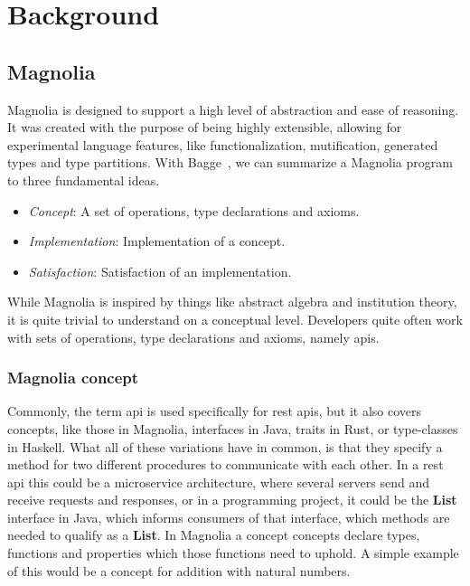 \chapter{Background} \label{cha:background}

\section{Magnolia}

Magnolia is designed to support a high level of abstraction and ease of
reasoning. It was created with the purpose of being highly extensible,
allowing for experimental language features, like functionalization,
mutification, generated types and type partitions. With Bagge~\cite{baggeThesis},
we can summarize a Magnolia program to three fundamental ideas.

\begin{itemize}
  \item \textit{Concept}: A set of operations, type declarations and axioms.
  \item \textit{Implementation}: Implementation of a concept.
  \item \textit{Satisfaction}: Satisfaction of an implementation.
\end{itemize}

While Magnolia is inspired by things like abstract algebra and institution
theory, it is quite trivial to understand on a conceptual level. Developers quite
often work with sets of operations, type declarations and axioms, namely
\gls*{api}s.

\subsection{Magnolia concept}

Commonly, the term \gls*{api} is used specifically for \gls*{rest} \gls*{api}s, but
it also covers concepts, like those in Magnolia, interfaces in Java, traits in
Rust, or type-classes in Haskell. What all of these variations have in common, 
is that they specify a method for two different procedures to communicate with 
each other. In a \gls*{rest} \gls*{api} this could be a microservice architecture,
where several servers send and receive requests and responses, or in a 
programming project, it could be the \textbf{List} interface in Java, which 
informs consumers of that interface, which methods are needed to qualify as a
\textbf{List}. In Magnolia a concept concepts declare types, functions and 
properties which those functions need to uphold. A simple example of this 
would be a concept for addition with natural numbers.

